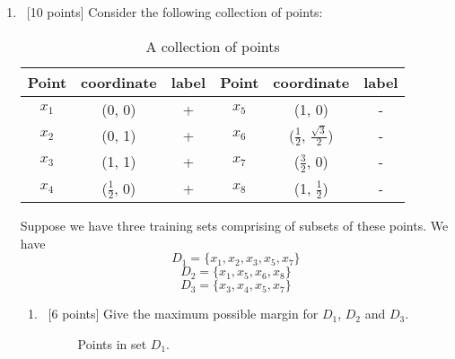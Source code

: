 \begin{enumerate}
\item ~[10 points]  Consider the following collection of points:
  \begin{table}[H]
    \centering
    \begin{tabular}{| c | c | c  ||  c | c | c |}
      \hline
      Point & coordinate  & label & Point & coordinate  & label \\
      \hline
      $x_1$ & (0, 0)             & + & $x_5$ & (1, 0)                                & - \\
      $x_2$ & (0, 1)             & + & $x_6$ & ($\frac{1}{2}$, $\frac{\sqrt{3}}{2}$) & - \\
      $x_3$ & (1, 1)             & + & $x_7$ & ($\frac{3}{2}$, 0)                    & - \\
      $x_4$ & ($\frac{1}{2}$, 0) & + & $x_8$ & (1, $\frac{1}{2}$)                    & - \\
      \hline
    \end{tabular}
    \caption{A collection of points}
  \end{table}

  Suppose we have three training sets comprising of subsets of these
  points. We have
  $$D_1 = \{x_1, x_2, x_3, x_5, x_7\}$$
  $$D_2 = \{x_1, x_5, x_6, x_8\}$$
  $$D_3 = \{x_3, x_4, x_5, x_ 7\}$$

  \begin{enumerate}
  \item ~[6 points] Give the maximum possible margin for $D_1$, $D_2$
    and $D_3$.
   
   \begin{figure}[H]
    \centering
    \caption{Points in set $D_1$.} \label{SetD1}
  \end{figure}   


\end{enumerate}
\end{enumerate}
